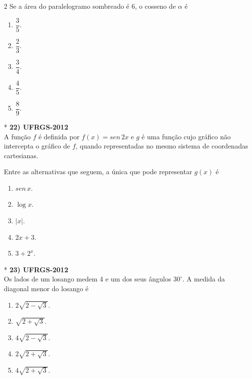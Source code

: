 \documentclass[11pt,a4paper]{article}
\begin{document}
\begin{paracol}{2}
    Se a área do paralelogramo sombreado é 6, o cosseno de $\alpha$ é

    \begin{enumerate}[label=(\Alph*), itemsep=0.2cm]
        \item $\dfrac{3}{5}$.
        \item $\dfrac{2}{3}$.
        \item $\dfrac{3}{4}$.
        \item $\dfrac{4}{5}$.
        \item $\dfrac{8}{9}$.
    \end{enumerate}
    \vspace{0.4cm}

    \switchcolumn[1]
    \vspace{8.5cm}

    \switchcolumn[0]*
    \textbf{22) UFRGS-2012} \\
    A função $f$ é definida por $f(x) = sen\, 2x$ e $g$ é uma função cujo gráfico não intercepta o gráfico de $f$, quando representadas no mesmo sistema de coordenadas cartesianas.

    Entre as alternativas que seguem, a única que pode representar $g(x)$ é

    \begin{enumerate}[label=(\Alph*), itemsep=0.2cm]
        \item $sen\, x$.
        \item $\log x$.
        \item $|x|$.
        \item $2x + 3$.
        \item $3 + 2^x$.
    \end{enumerate}
    \vspace{0.4cm}

    \switchcolumn[1]
    \vspace{6cm}

    \switchcolumn[0]*
    \textbf{23) UFRGS-2012} \\
    Os lados de um losango medem 4 e um dos seus ângulos $30^\circ$. A medida da diagonal menor do losango é

    \begin{enumerate}[label=(\Alph*), itemsep=0.2cm]
        \item $2\sqrt{2 - \sqrt{3}}$.
        \item $\sqrt{2 + \sqrt{3}}$.
        \item $4\sqrt{2 - \sqrt{3}}$.
        \item $2\sqrt{2 + \sqrt{3}}$.
        \item $4\sqrt{2 + \sqrt{3}}$.
    \end{enumerate}
    \vspace{0.4cm}


\end{paracol}
\end{document}
